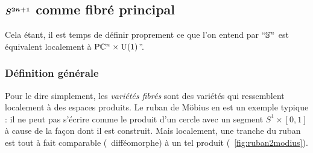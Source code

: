 \subsection{$\bf{S^{2n+1}}$ comme fibré principal} \label{subsec:VFP}

Cela étant, il est temps de définir proprement ce que l'on entend par ``$\S{n}$ est équivalent localement à $\PC{n}\times\U{1}$''.

\subsubsection{Définition générale}\label{subsec:def2VFP}

Pour le dire simplement, les \emph{variétés fibrés} sont des variétés qui ressemblent localement à des espaces produits. 
Le ruban de Möbius en est un exemple typique : il ne peut pas s'écrire comme le produit d'un cercle avec un segment $S^{1}\times [0,1]$ à cause de la façon dont il est construit. Mais localement, une tranche du ruban est tout à fait comparable (\ie~difféomorphe) à un tel produit (\cf~\cref{fig:ruban2modius}).
\\

